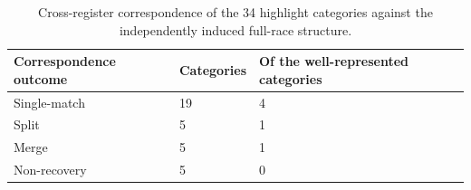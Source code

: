 \begin{table}[H]
\centering\rmfamily\footnotesize
\caption{Cross-register correspondence of the 34 highlight categories against the independently induced full-race structure.}
\label{tab:correspondence}
\begin{tabular}{lll}
\toprule
Correspondence outcome & Categories & Of the well-represented categories \\
\midrule
Single-match & 19 & 4 \\
Split & 5 & 1 \\
Merge & 5 & 1 \\
Non-recovery & 5 & 0 \\
\bottomrule
\end{tabular}
\end{table}
